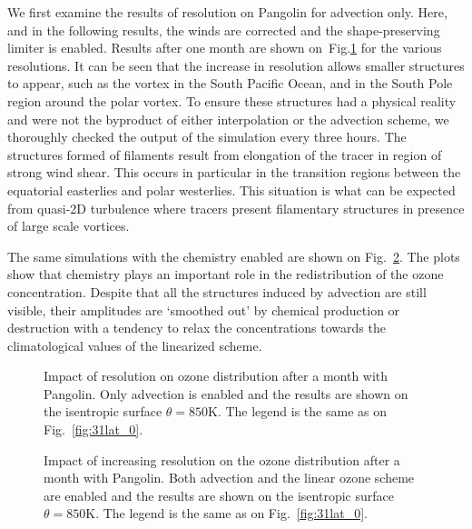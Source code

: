 We first examine the results of resolution on Pangolin for advection only.
Here, and in the following results, the winds are corrected and the
shape-preserving limiter is enabled. Results after one month are shown
on~Fig.\ref{fig:advec_T} for the various resolutions.  It can be seen that the
increase in resolution allows smaller structures to appear, such as the vortex
in the South Pacific Ocean, and in the South Pole region around the polar
vortex. To ensure these structures had a physical reality and were not the
byproduct of either interpolation or the advection scheme, we thoroughly checked
the output of the simulation every three hours. The structures formed of
filaments result from elongation of the tracer in region of strong wind
shear. This occurs in particular in the transition regions between the
equatorial easterlies and polar westerlies. This situation is what can be
expected from quasi-2D turbulence where tracers present filamentary structures
in presence of large scale vortices. 

The same simulations with the chemistry enabled are shown on
Fig.~\ref{fig:chem_T}. The plots show that chemistry plays an important role in
the redistribution of the ozone concentration. Despite that all the structures
induced by advection are still visible, their amplitudes are `smoothed out' by
chemical production or destruction with a tendency to relax the concentrations
towards the climatological values of the linearized scheme.

\begin{figure}
  \centering
  \hfill
  \hfill
  \caption{Impact of resolution on ozone distribution after a month with
  Pangolin. Only advection is enabled and the results are shown on the isentropic
  surface $\theta=850$K. The legend is the same as on Fig.~\ref{fig:31lat_0}.}
\label{fig:advec_T}
\end{figure}

\begin{figure}
  \centering
  \hfill
  \hfill
    \caption{Impact of increasing resolution on the ozone distribution after a
      month with Pangolin. Both advection and the linear ozone scheme are
      enabled and the results are shown on the isentropic surface
      $\theta=850$K. The legend is the same as on Fig.~\ref{fig:31lat_0}.}
\label{fig:chem_T}
\end{figure}

